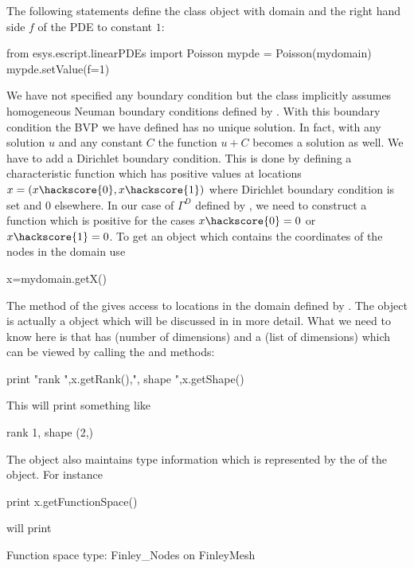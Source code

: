 The following statements define the \Poisson class object  with domain  and
the right hand side $f$ of the PDE to constant $1$: 
\begin{python}
  from esys.escript.linearPDEs import Poisson
  mypde = Poisson(mydomain)
  mypde.setValue(f=1)
\end{python}
We have not specified any boundary condition but the \Poisson class implicitly
assumes homogeneous Neuman boundary conditions defined by .
With this boundary condition the BVP we have
defined has no unique solution.
In fact, with any solution $u$ and any constant $C$ the function $u+C$ becomes
a solution as well.
We have to add a Dirichlet boundary condition.
This is done by defining a characteristic function
which has positive values at locations $x=(x\hackscore{0},x\hackscore{1})$
where Dirichlet boundary condition is set and $0$ elsewhere.
In our case of $\Gamma^D$ defined by , we need to
construct a function  which is positive for the cases $x\hackscore{0}=0$ or $x\hackscore{1}=0$.
To get an object  which contains the coordinates of the nodes in the domain use
\begin{python}
  x=mydomain.getX() 
\end{python}
The method  of the \Domain {} gives access to locations
in the domain defined by .
The object  is actually a \Data object which will be discussed in
 in more detail.
What we need to know here is that  has \Rank (number of dimensions) and
a \Shape (list of dimensions) which can be viewed by calling the  and  methods:
\begin{python}
  print "rank ",x.getRank(),", shape ",x.getShape()
\end{python}
This will print something like
\begin{python}
  rank 1, shape (2,)
\end{python}
The \Data object also maintains type information which is represented by the 
\FunctionSpace of the object. For instance
\begin{python}
  print x.getFunctionSpace()
\end{python}
will print 
\begin{python}
  Function space type: Finley_Nodes on FinleyMesh 
\end{python}
